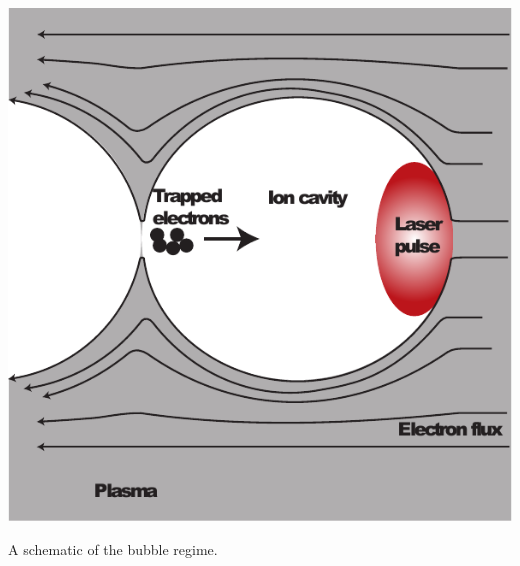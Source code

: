 \documentclass[12pt,letter]{article}
\begin{document}
    \begin{marginfigure}[-70pt]
    \includegraphics[width=\marginparwidth]{../figures/bubbleschem.pdf}
    \caption{A schematic of the bubble
    regime.\cite{genothesis}\label{fig:bubbleschem}}
\end{marginfigure}
\end{document}
